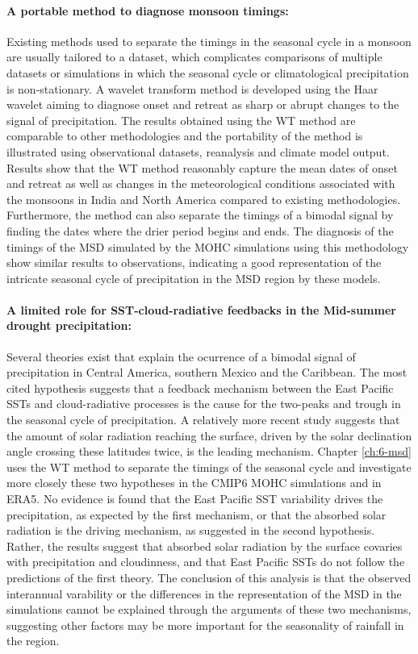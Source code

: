 \paragraph{A portable method to diagnose monsoon timings:}
Existing methods used to separate the timings in the seasonal cycle in a monsoon are usually tailored to a dataset, which complicates comparisons of multiple datasets or simulations in which the seasonal cycle or climatological precipitation is non-stationary. 
A wavelet transform method is developed using the Haar wavelet aiming to diagnose onset and retreat as sharp or abrupt changes to the signal of precipitation.
The results obtained using the WT method are comparable to other methodologies and the portability of the method is illustrated using observational datasets, reanalysis and climate model output. 
Results show that the WT method reasonably capture the mean dates of onset and retreat as well as changes in the meteorological conditions associated with the monsoons in India and North America compared to existing methodologies. 
Furthermore, the method can also separate the timings of a bimodal signal by finding the dates where the drier period begins and ends. 
The diagnosis of the timings of the MSD simulated by the MOHC simulations using this methodology show similar results to observations, indicating a good representation of the intricate seasonal cycle of precipitation in the MSD region by these models.


\paragraph{A limited role for SST-cloud-radiative feedbacks in the Mid-summer drought precipitation:}
Several theories exist that explain the ocurrence of a bimodal signal of precipitation in Central America, southern Mexico and the Caribbean. 
The most cited hypothesis suggests that a feedback mechanism between the East Pacific SSTs and cloud-radiative processes is the cause for the two-peaks and trough in the seasonal cycle of precipitation. 
A relatively more recent study suggests that the amount of solar radiation reaching the surface, driven by the solar declination angle crossing these latitudes twice, is the leading mechanism. 
Chapter \ref{ch:6-msd} uses the WT method to separate the timings of the seasonal cycle and investigate more closely these two hypotheses in the CMIP6 MOHC simulations and in ERA5.
No evidence is found that the East Pacific SST variability drives the precipitation, as expected by the first mechanism, or that the absorbed solar radiation is the driving mechanism, as suggested in the second hypothesis.
 Rather, the results suggest that absorbed solar radiation by the surface covaries with precipitation and cloudinness, and that East Pacific SSTs do not follow the predictions of the first theory.
The conclusion of this analysis is that the observed interannual varability or the differences in the representation of the MSD in the simulations cannot be explained through the arguments of these two mechanisms, suggesting other factors may be more important for the seasonality of rainfall in the region. 

